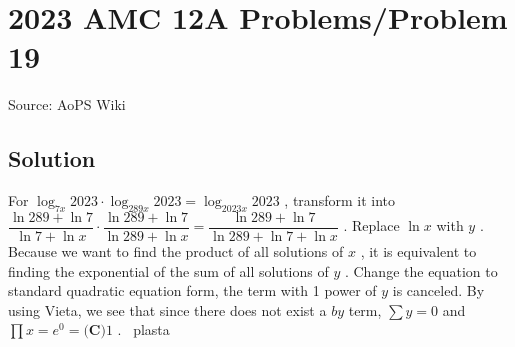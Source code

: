 \documentclass[12pt]{article}
\begin{document}
\section*{{2023 AMC 12A Problems/Problem 19}}
Source: AoPS Wiki

\subsection*{Solution}
For $\log_{7x}2023\cdot \log_{289x}2023=\log_{2023x}2023$ , transform it into $\dfrac{\ln 289+\ln 7}{\ln 7 + \ln x}\cdot \dfrac{\ln 289+\ln 7}{\ln 289 + \ln x}=\dfrac{\ln 289+\ln 7}{\ln 289+\ln 7+\ln x}$ . Replace $\ln x$ with $y$ . Because we want to find the product of all solutions of $x$ , it is equivalent to finding the exponential of the sum of all solutions of $y$ . Change the equation to standard quadratic equation form, the term with 1 power of $y$ is canceled. By using Vieta, we see that since there does not exist a $by$ term, $\sum y=0$ and $\prod x=e^0=\boxed{\textbf{(C)} 1}$ . ~plasta
\end{document}
